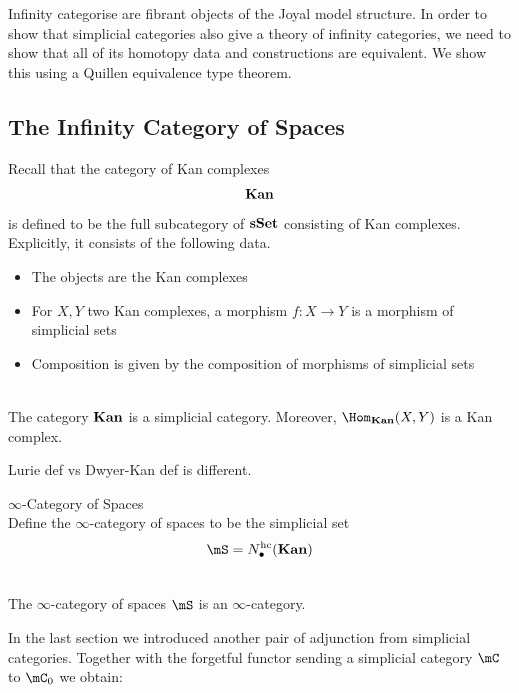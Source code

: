 \documentclass[a4paper]{article}
\begin{document}
Infinity categorise are fibrant objects of the Joyal model structure. In order to show that simplicial categories also give a theory of infinity categories, we need to show that all of its homotopy data and constructions are equivalent. We show this using a Quillen equivalence type theorem. 

\subsection{The Infinity Category of Spaces}
Recall that the category of Kan complexes $$\bold{Kan}$$ is defined to be the full subcategory of $\bold{sSet}$ consisting of Kan complexes. Explicitly, it consists of the following data. 
\begin{itemize}
\item The objects are the Kan complexes
\item For $X,Y$ two Kan complexes, a morphism $f:X\to Y$ is a morphism of simplicial sets
\item Composition is given by the composition of morphisms of simplicial sets
\end{itemize}

\begin{lmm}{}{}\\ The category $\bold{Kan}$ is a simplicial category. Moreover, $\Hom_\bold{Kan}(X,Y)$ is a Kan complex. 
\end{lmm}

Lurie def vs Dwyer-Kan def is different. 

\begin{defn}{$\infty$-Category of Spaces}{}\\ Define the $\infty$-category of spaces to be the simplicial set $$\mS=N_\bullet^\text{hc}(\bold{Kan})$$
\end{defn}

\begin{lmm}{}{}\\ The $\infty$-category of spaces $\mS$ is an $\infty$-category. 
\end{lmm}

In the last section we introduced another pair of adjunction from simplicial categories. Together with the forgetful functor sending a simplicial category $\mC$ to $\mC_0$ we obtain: \\
\\
\end{document}
